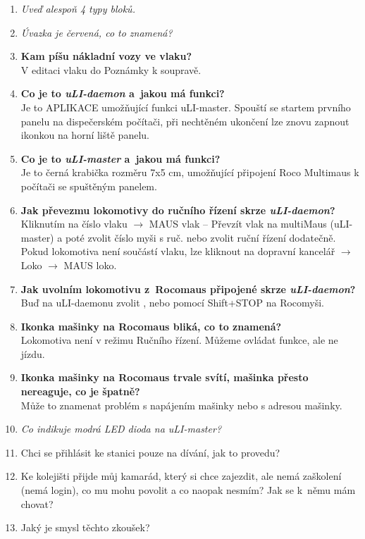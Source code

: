 \documentclass[12pt,a4paper]{article}
\begin{document}
\begin{enumerate}[leftmargin=*]
\item \textit{Uveď alespoň 4 typy bloků.}

\item \textit{Úvazka je červená, co to znamená?}

\item \textbf{Kam píšu nákladní vozy ve vlaku?}
\\V editaci vlaku do Poznámky k soupravě.

\item \textbf{Co je to \textit{uLI-daemon} a~jakou má funkci?}
\\Je to APLIKACE umožňující funkci uLI-master. Spouští se startem prvního panelu na dispečerském počítači, při nechtěném ukončení lze znovu zapnout ikonkou na horní liště panelu.

\item \textbf{Co je to \textit{uLI-master} a~jakou má funkci?}
\\Je to černá krabička rozměru 7x5 cm, umožňující připojení Roco Multimaus k počítači se spuštěným panelem.

\item \textbf{Jak převezmu lokomotivy do ručního řízení skrze \textit{uLI-daemon}?}
\\Kliknutím na číslo vlaku $\rightarrow$ MAUS vlak -- Převzít vlak na multiMaus (uLI-master) a poté zvolit číslo myši s ruč. nebo zvolit ruční řízení dodatečně. Pokud lokomotiva není součástí vlaku, lze kliknout na dopravní kancelář $\rightarrow$ Loko $\rightarrow$ MAUS loko.

\item \textbf{Jak uvolním lokomotivu z~Rocomaus připojené skrze \textit{uLI-daemon}?}
\\Buď na uLI-daemonu zvolit , nebo pomocí Shift+STOP na Rocomyši.

\item \textbf{Ikonka mašinky na Rocomaus bliká, co to znamená?}
\\Lokomotiva není v režimu Ručního řízení. Můžeme ovládat funkce, ale ne jízdu.

\item \textbf{Ikonka mašinky na Rocomaus trvale svítí, mašinka přesto nereaguje, co je
špatně?}
\\Může to znamenat problém s napájením mašinky nebo s adresou mašinky.

\item \textit{Co indikuje modrá LED dioda na \textit{uLI-master}?}

\item Chci se přihlásit ke stanici pouze na dívání, jak to provedu?

\item Ke kolejišti přijde můj kamarád, který si chce zajezdit, ale nemá
zaškolení (nemá login), co mu mohu povolit a co naopak nesmím? Jak se k~němu
mám chovat?

\item Jaký je smysl těchto zkoušek?

\end{enumerate}
\end{document}
